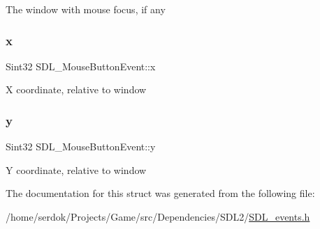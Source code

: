 The window with mouse focus, if any \mbox{\label{structSDL__MouseButtonEvent_a5bb9c61b86e999f58637511e32e3a076}} 
\subsubsection{\texorpdfstring{x}{x}}
{\footnotesize\ttfamily Sint32 S\+D\+L\+\_\+\+Mouse\+Button\+Event\+::x}

X coordinate, relative to window \mbox{\label{structSDL__MouseButtonEvent_a7ccb5c55a7ddadce723f4ea6d5269540}} 
\subsubsection{\texorpdfstring{y}{y}}
{\footnotesize\ttfamily Sint32 S\+D\+L\+\_\+\+Mouse\+Button\+Event\+::y}

Y coordinate, relative to window 

The documentation for this struct was generated from the following file\+:\begin{DoxyCompactItemize}
\item 
/home/serdok/\+Projects/\+Game/src/\+Dependencies/\+S\+D\+L2/\hyperlink{SDL__events_8h}{S\+D\+L\+\_\+events.\+h}\end{DoxyCompactItemize}

